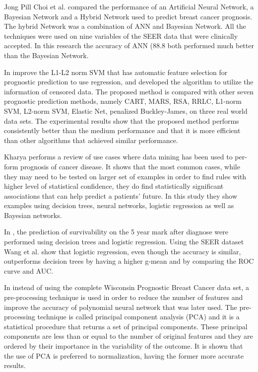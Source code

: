 Jong Pill Choi et al. compared the performance of an Artificial Neural Network, a Bayesian Network and a Hybrid Network used to predict breast
 cancer prognosis. The hybrid Network was a combination of ANN and Bayesian Network. All the techniques were used on nine variables of the
 SEER data that were clinically accepted. In this research the accuracy of ANN (88.8%
 both performed much better than the Bayesian Network. \cite{Choi2009}

In \cite{Sun2011} improve the L1-L2 norm SVM that has automatic feature selection for prognostic prediction to use regression, and developed
 the algorithm to utilize the information of censored data. The proposed method is compared with other seven prognostic prediction methods,
 namely CART, MARS, RSA, RRLC, L1-norm SVM, L2-norm SVM, Elastic Net, penalized Buckley-James, on three real world data sets. The experimental 
 results show that the proposed method performs consistently better than the medium performance and that it is more efficient than other
 algorithms that achieved similar performance.

Kharya performs a review of use cases where data mining has been used to per-form prognosis of cancer disease. It shows that the most 
common cases, while they may need to be tested on larger set of examples in order to find rules with higher level of statistical confidence, 
they do find statistically significant associations that can help predict a patients’ future. In this study they show examples using decision
 trees, neural networks, logistic regression as well as Bayesian networks. \cite{Kharya2012}

In \cite{Wang2012}, the prediction of survivability on the 5 year mark after diagnose were performed using decision trees and logistic regression.
 Using the SEER dataset Wang et al. show that logistic regression, even though the accuracy is similar, outperforms decision trees by having a
 higher g-mean and by comparing the ROC curve and AUC.

In \cite{Saxena2013} instead of using the complete Wisconsin Prognostic Breast Cancer data set, a pre-processing technique 
is used in order to reduce the number of features and improve the accuracy of polynomial neural network that was later used. 
The pre-processing technique is called principal component analysis (PCA) and it is a statistical procedure that returns a set
 of principal components. These principal components are less than or equal to the number of original features and they are ordered 
 by their importance in the variability of the outcome. It is shown that the use of PCA is preferred to normalization, having the 
 former more accurate results.

